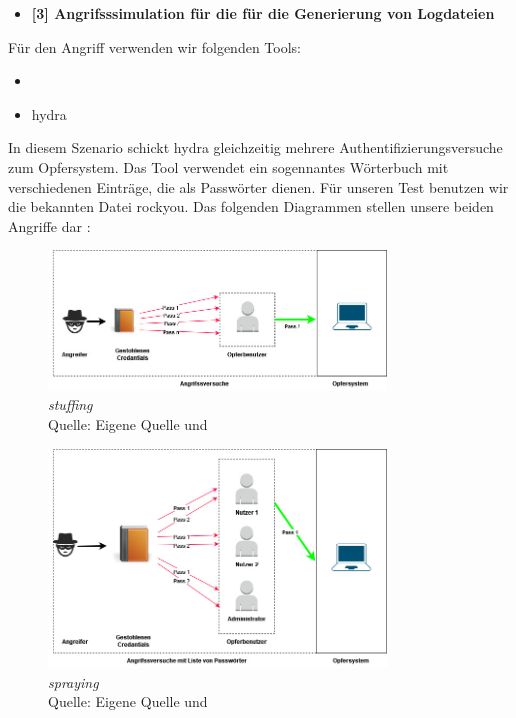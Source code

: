 \begin{itemize}[noitemsep]
   \item	\textbf{[3] Angrifsssimulation für die für die Generierung von Logdateien}
\end{itemize}

Für den Angriff verwenden wir folgenden Tools:

\begin{itemize}[noitemsep]
   \item	{}
   \item \gls{hydra}
\end{itemize}

In diesem Szenario schickt \gls{hydra} gleichzeitig mehrere Authentifizierungsversuche zum Opfersystem. Das Tool verwendet ein sogennantes Wörterbuch mit verschiedenen Einträge, die als Passwörter dienen. Für unseren Test benutzen wir die bekannten Datei \gls{rockyou}. Das folgenden Diagrammen stellen unsere beiden Angriffe dar :


\begin{figure}[H]
   \centering
   \includegraphics[width=0.8\textwidth]{assets/Stuffing.jpg}
   \caption{\textit{\gls{stuffing}}\\Quelle: Eigene Quelle und \citep{Nguyen_stuffing}}
   \centering
\end{figure}


\begin{figure}[H]
   \centering
   \includegraphics[width=0.8\textwidth]{assets/Spraying.jpg}
   \caption{\textit{\gls{spraying}}\\Quelle: Eigene Quelle und \citep{Swathi_spraxy}}
   \centering
\end{figure}


